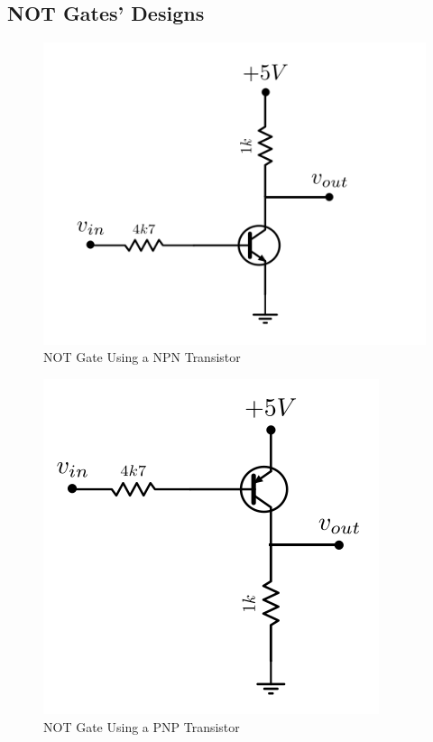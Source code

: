 \subsection{\color{purple}NOT Gates' Designs}

\begin{figure}[h!]
\centering
\includegraphics[scale=0.7]{../Exercise1/circuitoNPN}
\caption{\color{cyan}NOT Gate Using a NPN Transistor}
\label{circNPN}
\end{figure}

\begin{figure}[h!]
\centering
\includegraphics[scale=0.7]{../Exercise1/circuitoPNP}
\caption{\color{cyan}NOT Gate Using a PNP Transistor}
\label{circPNP}
\end{figure}


